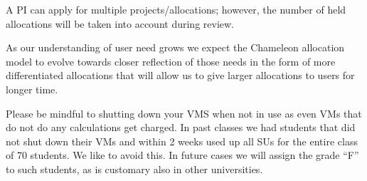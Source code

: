 A PI can apply for multiple projects/allocations; however, the number of
held allocations will be taken into account during review.

As our understanding of user need grows we expect the Chameleon
allocation model to evolve towards closer reflection of those needs in
the form of more differentiated allocations that will allow us to give
larger allocations to users for longer time.

\begin{IU}
  Please be mindful to shutting down your VMS when not in use as even VMs 
  that do not do any calculations get charged. In past classes we had students 
  that did not shut down their VMs and within 2 weeks used up all SUs 
  for the entire class of 70 students. We like to avoid this. In future cases 
  we will assign the grade ``F'' to such students, as is customary also 
  in other universities.
\end{IU}
